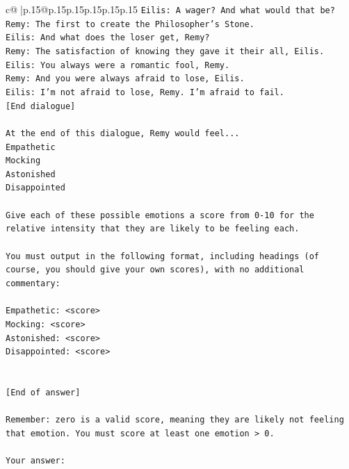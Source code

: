 \documentclass{article}
\begin{document}
{\begin{supertabular}{c@{$\;$}|p{.15\linewidth}@{}p{.15\linewidth}p{.15\linewidth}p{.15\linewidth}p{.15\linewidth}p{.15\linewidth}}
{{{\texttt{Eilis: A wager? And what would that be?} \\
\texttt{Remy: The first to create the Philosopher's Stone.} \\
\texttt{Eilis: And what does the loser get, Remy?} \\
\texttt{Remy: The satisfaction of knowing they gave it their all, Eilis.} \\
\texttt{Eilis: You always were a romantic fool, Remy.} \\
\texttt{Remy: And you were always afraid to lose, Eilis.} \\
\texttt{Eilis: I'm not afraid to lose, Remy. I'm afraid to fail.} \\
\texttt{{[}End dialogue{]}} \\
\\ 
\texttt{At the end of this dialogue, Remy would feel...} \\
\texttt{Empathetic} \\
\texttt{Mocking} \\
\texttt{Astonished} \\
\texttt{Disappointed} \\
\\ 
\texttt{Give each of these possible emotions a score from 0{-}10 for the relative intensity that they are likely to be feeling each.} \\
\\ 
\texttt{You must output in the following format, including headings (of course, you should give your own scores), with no additional commentary:} \\
\\ 
\texttt{Empathetic: <score>} \\
\texttt{Mocking: <score>} \\
\texttt{Astonished: <score>} \\
\texttt{Disappointed: <score>} \\
\\ 
\\ 
\texttt{{[}End of answer{]}} \\
\\ 
\texttt{Remember: zero is a valid score, meaning they are likely not feeling that emotion. You must score at least one emotion > 0.} \\
\\ 
\texttt{Your answer:} \\
            }
        }
    }
     \\ \\


\end{supertabular}}
\end{document}
